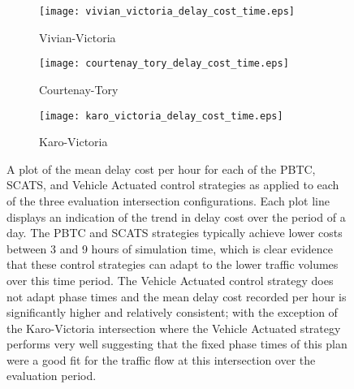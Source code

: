 \begin{figure}[H]
\centering
\begin{subfigure}{.5\textwidth}
  \centering
  \texttt{[image: vivian\_victoria\_delay\_cost\_time.eps]}
  \caption{Vivian-Victoria}
  \label{delay_cost_time:sub1}
\end{subfigure}%
\begin{subfigure}{.5\textwidth}
  \centering
  \texttt{[image: courtenay\_tory\_delay\_cost\_time.eps]}
  \caption{Courtenay-Tory}
  \label{delay_cost_time:sub2}
\end{subfigure}

\vspace{1cm}

\begin{subfigure}{.5\textwidth}
  \centering
  \texttt{[image: karo\_victoria\_delay\_cost\_time.eps]}
  \caption{Karo-Victoria}
  \label{delay_cost_time:sub3}
\end{subfigure}%
\caption[Results of measuring the mean delay cost per hour incurred for each evaluation control strategy and intersection.]{ A plot of the mean delay cost per hour for each of the PBTC, SCATS, and Vehicle Actuated control strategies as applied to each of the three evaluation intersection configurations. Each plot line displays an indication of the trend in delay cost over the period of a day. The PBTC and SCATS strategies typically achieve lower costs between 3 and 9 hours of simulation time, which is clear evidence that these control strategies can adapt to the lower traffic volumes over this time period. The Vehicle Actuated control strategy does not adapt phase times and the mean delay cost recorded per hour is significantly higher and relatively consistent; with the exception of the Karo-Victoria intersection where the Vehicle Actuated strategy performs very well suggesting that the fixed phase times of this plan were a good fit for the traffic flow at this intersection over the evaluation period. }
\label{eval:delay_cost_time}
\end{figure}

